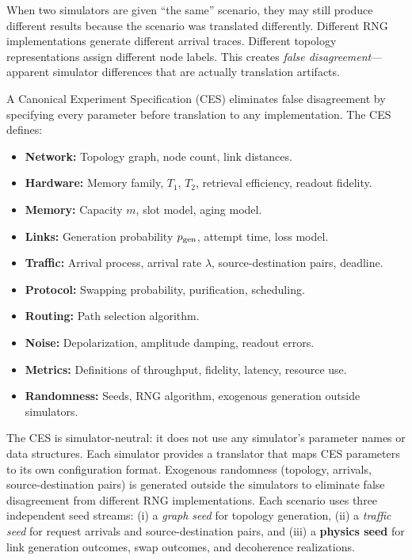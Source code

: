 \documentclass[aps,prapplied,reprint,superscriptaddress]{revtex4-2}
\begin{document}
When two simulators are given ``the same'' scenario, they may still produce different results because the scenario was translated differently. Different RNG implementations generate different arrival traces. Different topology representations assign different node labels. This creates \emph{false disagreement}---apparent simulator differences that are actually translation artifacts.

A Canonical Experiment Specification (CES) eliminates false disagreement by specifying every parameter before translation to any implementation. The CES defines:

\begin{itemize}[leftmargin=2em]
\item \textbf{Network:} Topology graph, node count, link distances.
\item \textbf{Hardware:} Memory family, $T_1$, $T_2$, retrieval efficiency, readout fidelity.
\item \textbf{Memory:} Capacity $m$, slot model, aging model.
\item \textbf{Links:} Generation probability $p_{\rm gen}$, attempt time, loss model.
\item \textbf{Traffic:} Arrival process, arrival rate $\lambda$, source-destination pairs, deadline.
\item \textbf{Protocol:} Swapping probability, purification, scheduling.
\item \textbf{Routing:} Path selection algorithm.
\item \textbf{Noise:} Depolarization, amplitude damping, readout errors.
\item \textbf{Metrics:} Definitions of throughput, fidelity, latency, resource use.
\item \textbf{Randomness:} Seeds, RNG algorithm, exogenous generation outside simulators.
\end{itemize}

The CES is simulator-neutral: it does not use any simulator's parameter names or data structures. Each simulator provides a translator that maps CES parameters to its own configuration format. Exogenous randomness (topology, arrivals, source-destination pairs) is generated outside the simulators to eliminate false disagreement from different RNG implementations. Each scenario uses three independent seed streams: (i) a \emph{graph seed} for topology generation, (ii) a \emph{traffic seed} for request arrivals and source-destination pairs, and (iii) a \textbf{physics seed} for link generation outcomes, swap outcomes, and decoherence realizations.
\end{document}
